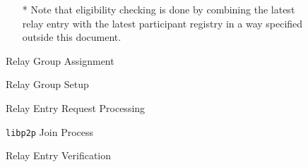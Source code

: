 \documentclass{article}
\begin{document}
\begin{figure}
  \centering
  
  
  \caption{\label{fig:relay-group-assignment}Relay Group Assignment}

  \vspace{0.5cm}
  \begin{itemize}
  \item[*] Note that eligibility checking is done by combining the latest relay
           entry with the latest participant registry in a way specified outside
           this document.
  \end{itemize}
\end{figure}

\begin{figure}
  \centering
  
  
  \caption{\label{fig:relay-group-setup}Relay Group Setup}
\end{figure}

\begin{figure}
  \centering
  
   
  \caption{\label{fig:relay-entry-request-processing}Relay Entry Request Processing}
\end{figure}

\begin{figure}
  \centering
  

  \caption{\label{fig:libp2p-join}{\tt libp2p} Join Process}
\end{figure}

\begin{figure}
  \centering
  

  \caption{\label{fig:relay-entry-verification}Relay Entry Verification}
\end{figure}
\end{document}
